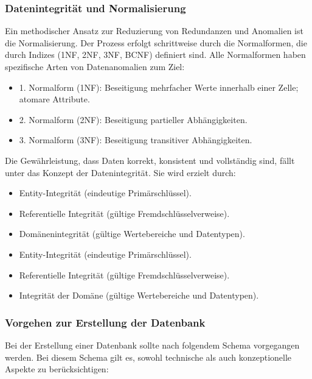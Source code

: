 \subsubsection{Datenintegrität und Normalisierung}
Ein methodischer Ansatz zur Reduzierung von Redundanzen und Anomalien ist die Normalisierung.
Der Prozess erfolgt schrittweise durch die Normalformen, die durch Indizes  (1NF, 2NF, 3NF, BCNF) definiert sind.
Alle Normalformen haben spezifische Arten von Datenanomalien zum Ziel:

\begin{itemize}

\item 1. Normalform (1NF): Beseitigung mehrfacher Werte innerhalb einer Zelle;  atomare Attribute.
\item 2. Normalform (2NF): Beseitigung partieller Abhängigkeiten.
\item 3. Normalform (3NF): Beseitigung transitiver Abhängigkeiten.

\end{itemize}

Die Gewährleistung, dass Daten korrekt, konsistent und vollständig sind,
fällt unter das Konzept der Datenintegrität.
Sie wird erzielt durch:

\begin{itemize}
\item
Entity-Integrität (eindeutige Primärschlüssel).
\item
Referentielle Integrität (gültige Fremdschlüsselverweise).

\item Domänenintegrität (gültige Wertebereiche und Datentypen).
\item Entity-Integrität (eindeutige Primärschlüssel).
\item Referentielle Integrität (gültige Fremdschlüsselverweise).
\item Integrität der Domäne (gültige Wertebereiche und Datentypen).

\end{itemize}

\subsubsection{Vorgehen zur Erstellung der Datenbank}
Bei der Erstellung einer Datenbank sollte nach folgendem Schema vorgegangen werden.
Bei diesem Schema gilt es, sowohl technische als auch konzeptionelle Aspekte zu berücksichtigen:


